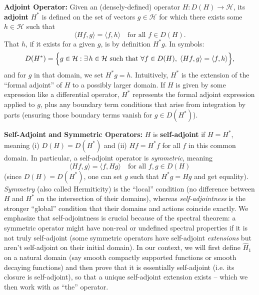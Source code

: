 \documentclass[12pt]{article}
\theoremstyle{plain}
\theoremstyle{definition}
\begin{document}
\textbf{Adjoint Operator:} Given an (densely-defined) operator \(H: D(H)\to\mathcal{H}\), its \textbf{adjoint} \(H^*\) is defined on the set of vectors \(g\in \mathcal{H}\) for which there exists some \(h\in \mathcal{H}\) such that
\[
\langle Hf, g\rangle = \langle f, h\rangle\quad \text{for all } f\in D(H).
\]
That \(h\), if it exists for a given \(g\), is by definition \(H^* g\). In symbols:
\[
D(H^*) = \Bigl\{ g\in \mathcal{H}: \exists\, h\in \mathcal{H} \text{ such that } \forall f\in D(H),\; \langle Hf, g\rangle = \langle f, h\rangle \Bigr\},
\]
and for \(g\) in that domain, we set \(H^* g = h\). Intuitively, \(H^*\) is the extension of the ``formal adjoint'' of \(H\) to a possibly larger domain. If \(H\) is given by some expression like a differential operator, \(H^*\) represents the formal adjoint expression applied to \(g\), plus any boundary term conditions that arise from integration by parts (ensuring those boundary terms vanish for \(g\in D(H^*)\)).

\textbf{Self-Adjoint and Symmetric Operators:} \(H\) is \textbf{self-adjoint} if \(H=H^*\), meaning (i) \(D(H) = D(H^*)\) and (ii) \(Hf = H^*f\) for all \(f\) in this common domain. In particular, a self-adjoint operator is \emph{symmetric}, meaning
\[
\langle Hf, g\rangle = \langle f, H g\rangle \quad \text{for all } f,g\in D(H)
\]
(since \(D(H)=D(H^*)\), one can set \(g\) such that \(H^* g = Hg\) and get equality). \emph{Symmetry} (also called Hermiticity) is the ``local'' condition (no difference between \(H\) and \(H^*\) on the intersection of their domains), whereas \emph{self-adjointness} is the stronger ``global'' condition that their domains and actions coincide exactly. We emphasize that self-adjointness is crucial because of the spectral theorem: a symmetric operator might have non-real or undefined spectral properties if it is not truly self-adjoint (some symmetric operators have self-adjoint \emph{extensions} but aren’t self-adjoint on their initial domain). In our context, we will first define \(\hat{H}_1\) on a natural domain (say smooth compactly supported functions or smooth decaying functions) and then prove that it is essentially self-adjoint (i.e. its closure is self-adjoint), so that a unique self-adjoint extension exists -- which we then work with as ``the'' operator.
\end{document}
